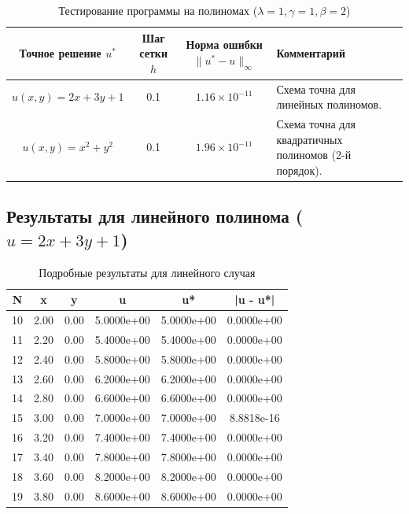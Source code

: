 \documentclass[a4paper,12pt]{article}
\begin{document}
\begin{table}[H]
    \centering
    \caption{Тестирование программы на полиномах ($\lambda=1, \gamma=1, \beta=2$)}
    \label{tab:poly}
    \begin{tabularx}{\textwidth}{|c|c|c|X|}
        \hline
        \textbf{Точное решение $u^*$} & \textbf{Шаг сетки $h$} & \textbf{Норма ошибки $\|u^* - u\|_\infty$} & \textbf{Комментарий} \\
        \hline
        $u(x,y) = 2x + 3y + 1$ & 0.1 & $1.16 \times 10^{-11}$ & Схема точна для линейных полиномов. \\
        \hline
        $u(x,y) = x^2 + y^2$ & 0.1 & $1.96 \times 10^{-11}$ & Схема точна для квадратичных полиномов (2-й порядок). \\
        \hline
    \end{tabularx}
\end{table}

\subsection{Результаты для линейного полинома ($u = 2x + 3y + 1$)}
\begin{table}[H]
    \centering
    \begin{tabular}{|c|c|c|c|c|c|}
        \hline
        N & x & y & u & u* & |u - u*| \\
        \hline
        10	& 2.00 & 0.00 & 5.0000e+00 & 5.0000e+00 & 0.0000e+00 \\
        11	& 2.20 & 0.00 & 5.4000e+00 & 5.4000e+00 & 0.0000e+00 \\
        12	& 2.40 & 0.00 & 5.8000e+00 & 5.8000e+00 & 0.0000e+00 \\
        13	& 2.60 & 0.00 & 6.2000e+00 & 6.2000e+00 & 0.0000e+00 \\
        14	& 2.80 & 0.00 & 6.6000e+00 & 6.6000e+00 & 0.0000e+00 \\
        15	& 3.00 & 0.00 & 7.0000e+00 & 7.0000e+00 & 8.8818e-16 \\
        16	& 3.20 & 0.00 & 7.4000e+00 & 7.4000e+00 & 0.0000e+00 \\
        17	& 3.40 & 0.00 & 7.8000e+00 & 7.8000e+00 & 0.0000e+00 \\
        18	& 3.60 & 0.00 & 8.2000e+00 & 8.2000e+00 & 0.0000e+00 \\
        19	& 3.80 & 0.00 & 8.6000e+00 & 8.6000e+00 & 0.0000e+00 \\
        \hline
    \end{tabular}
    \caption{Подробные результаты для линейного случая}
\end{table}
\end{document}
